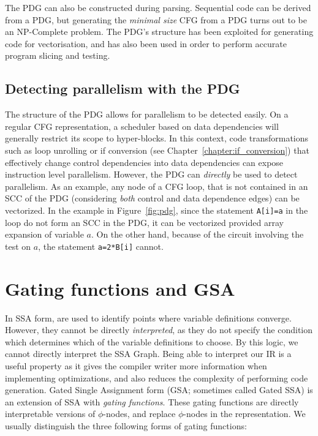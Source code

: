 The PDG can also be constructed during parsing. 
Sequential code can be derived from a PDG, but generating the {\it minimal size} CFG from a PDG turns out to be an NP-Complete problem. 
The PDG's structure has been exploited for generating code for vectorisation, and has also been used in order to perform accurate program slicing and testing.

\subsection{Detecting parallelism with the PDG}

The structure of the PDG allows for parallelism to be detected easily. 
On a regular CFG representation, a scheduler based on data dependencies will generally restrict its scope to hyper-blocks. 
In this context, code transformations such as loop unrolling or if conversion (see Chapter~\ref{chapter:if_conversion}) that effectively change control dependencies into data dependencies can expose instruction level parallelism. 
However, the PDG can \textit{directly} be used to detect parallelism. 
As an example, any node of a CFG loop, that is not contained in an SCC of the PDG (considering \textit{both} control and data dependence edges) can be vectorized. 
In the example in Figure~\ref{fig:pdg}, since the statement \texttt{A[i]=a} in the loop do not form an SCC in the PDG, it can be vectorized provided array expansion of variable $a$. 
On the other hand, because of the circuit involving the test on $a$, the statement \texttt{a=2*B[i]} cannot.


\section{Gating functions and GSA}
\label{sec:gating_functions}
In SSA form, \phifuns are used to identify points where variable definitions converge. 
However, they cannot be directly \textit{interpreted}, as they do not specify the condition which determines which of the variable definitions to choose. 
By this logic, we cannot directly interpret the SSA Graph. 
Being able to interpret our IR is a useful property as it gives the compiler writer more information when implementing optimizations, and also reduces the complexity of performing code generation. 
Gated Single Assignment form (GSA; 
sometimes called Gated SSA) is an extension of SSA with \textit{gating functions}. 
These gating functions are directly interpretable versions of $\phi$-nodes, and replace $\phi$-nodes in the representation. 
We usually distinguish the three following forms of gating functions:

